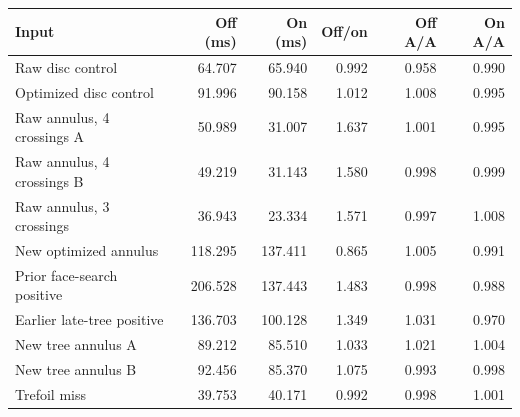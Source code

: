 \begin{tabular}{lrrrrr}
\toprule
Input & Off (ms) & On (ms) & Off/on & Off A/A & On A/A \\
\midrule
Raw disc control & 64.707 & 65.940 & 0.992 & 0.958 & 0.990 \\
Optimized disc control & 91.996 & 90.158 & 1.012 & 1.008 & 0.995 \\
Raw annulus, 4 crossings A & 50.989 & 31.007 & 1.637 & 1.001 & 0.995 \\
Raw annulus, 4 crossings B & 49.219 & 31.143 & 1.580 & 0.998 & 0.999 \\
Raw annulus, 3 crossings & 36.943 & 23.334 & 1.571 & 0.997 & 1.008 \\
New optimized annulus & 118.295 & 137.411 & 0.865 & 1.005 & 0.991 \\
Prior face-search positive & 206.528 & 137.443 & 1.483 & 0.998 & 0.988 \\
Earlier late-tree positive & 136.703 & 100.128 & 1.349 & 1.031 & 0.970 \\
New tree annulus A & 89.212 & 85.510 & 1.033 & 1.021 & 1.004 \\
New tree annulus B & 92.456 & 85.370 & 1.075 & 0.993 & 0.998 \\
Trefoil miss & 39.753 & 40.171 & 0.992 & 0.998 & 1.001 \\
\bottomrule
\end{tabular}
